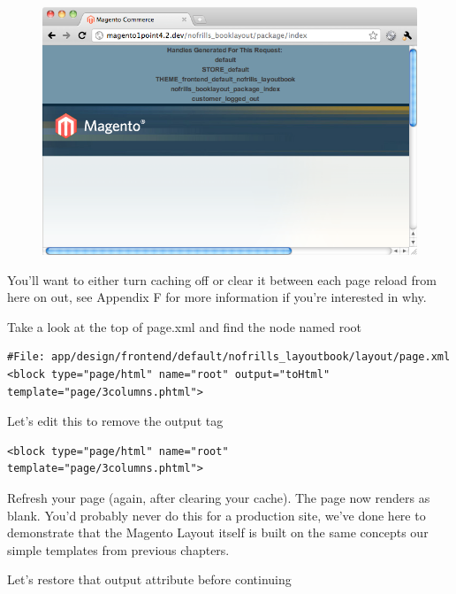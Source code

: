\documentclass[oneside]{book}
\begin{document}
\begin{figure}[htb]
\begin{center}
\leavevmode
\includegraphics[width=1\textwidth]{images/chapter3/blank-theme.png}
\end{center}
\caption{}
\end{figure}


You'll want to either turn caching off or clear it between each page reload from here on out, see Appendix F for more information if you're interested in why.

Take a look at the top of page.xml and find the node named root

\begin{lstlisting}
#File: app/design/frontend/default/nofrills_layoutbook/layout/page.xml 
<block type="page/html" name="root" output="toHtml"
template="page/3columns.phtml">

\end{lstlisting}


Let's edit this to remove the output tag    

\begin{lstlisting}
<block type="page/html" name="root" 
template="page/3columns.phtml">

\end{lstlisting}


Refresh your page (again, after clearing your cache).  The page now renders as blank.  You'd probably never do this for a production site, we've done here to demonstrate that the Magento Layout itself is built on the same concepts our simple templates from previous chapters. 

Let's restore that output attribute before continuing
\end{document}
